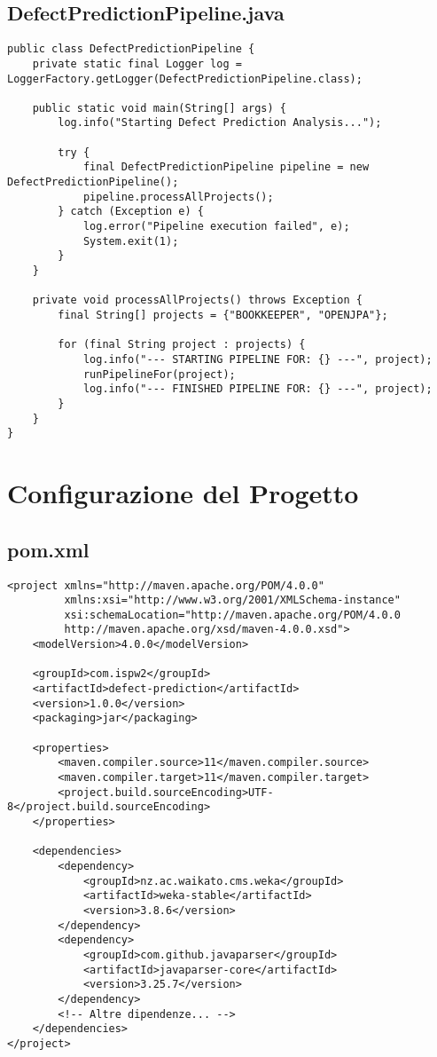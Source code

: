 \documentclass[12pt,a4paper]{article}
\begin{document}
\subsection{DefectPredictionPipeline.java}

\begin{lstlisting}[caption=Classe principale del pipeline]
public class DefectPredictionPipeline {
    private static final Logger log = LoggerFactory.getLogger(DefectPredictionPipeline.class);
    
    public static void main(String[] args) {
        log.info("Starting Defect Prediction Analysis...");
        
        try {
            final DefectPredictionPipeline pipeline = new DefectPredictionPipeline();
            pipeline.processAllProjects();
        } catch (Exception e) {
            log.error("Pipeline execution failed", e);
            System.exit(1);
        }
    }
    
    private void processAllProjects() throws Exception {
        final String[] projects = {"BOOKKEEPER", "OPENJPA"};
        
        for (final String project : projects) {
            log.info("--- STARTING PIPELINE FOR: {} ---", project);
            runPipelineFor(project);
            log.info("--- FINISHED PIPELINE FOR: {} ---", project);
        }
    }
}
\end{lstlisting}

\section{Configurazione del Progetto}

\subsection{pom.xml}

\begin{lstlisting}[caption=Configurazione Maven]
<project xmlns="http://maven.apache.org/POM/4.0.0"
         xmlns:xsi="http://www.w3.org/2001/XMLSchema-instance"
         xsi:schemaLocation="http://maven.apache.org/POM/4.0.0 
         http://maven.apache.org/xsd/maven-4.0.0.xsd">
    <modelVersion>4.0.0</modelVersion>
    
    <groupId>com.ispw2</groupId>
    <artifactId>defect-prediction</artifactId>
    <version>1.0.0</version>
    <packaging>jar</packaging>
    
    <properties>
        <maven.compiler.source>11</maven.compiler.source>
        <maven.compiler.target>11</maven.compiler.target>
        <project.build.sourceEncoding>UTF-8</project.build.sourceEncoding>
    </properties>
    
    <dependencies>
        <dependency>
            <groupId>nz.ac.waikato.cms.weka</groupId>
            <artifactId>weka-stable</artifactId>
            <version>3.8.6</version>
        </dependency>
        <dependency>
            <groupId>com.github.javaparser</groupId>
            <artifactId>javaparser-core</artifactId>
            <version>3.25.7</version>
        </dependency>
        <!-- Altre dipendenze... -->
    </dependencies>
</project>
\end{lstlisting}
\end{document}
